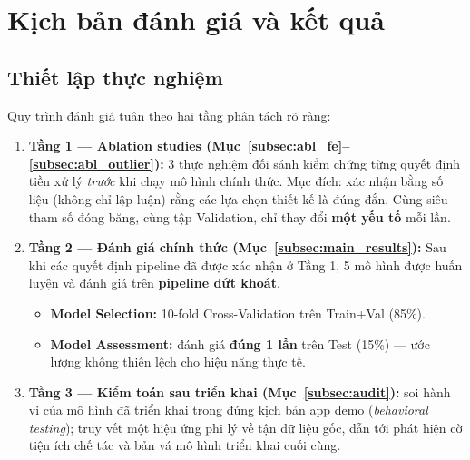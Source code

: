 \section{Kịch bản đánh giá và kết quả}
\label{sec:eval}

\subsection{Thiết lập thực nghiệm}

Quy trình đánh giá tuân theo hai tầng phân tách rõ ràng:

\begin{enumerate}[leftmargin=*, itemsep=3pt]
  \item \textbf{Tầng 1 — Ablation studies (Mục~\ref{subsec:abl_fe}--\ref{subsec:abl_outlier}):}
        3 thực nghiệm đối sánh kiểm chứng từng quyết định tiền xử lý \textit{trước} khi chạy
        mô hình chính thức.
        Mục đích: xác nhận bằng số liệu (không chỉ lập luận) rằng các lựa chọn thiết kế
        là đúng đắn.
        Cùng siêu tham số đóng băng, cùng tập Validation, chỉ thay đổi \textbf{một yếu tố} mỗi lần.

  \item \textbf{Tầng 2 — Đánh giá chính thức (Mục~\ref{subsec:main_results}):}
        Sau khi các quyết định pipeline đã được xác nhận ở Tầng 1,
        5 mô hình được huấn luyện và đánh giá trên \textbf{pipeline dứt khoát}.
        \begin{itemize}[itemsep=1pt]
          \item \textbf{Model Selection:} 10-fold Cross-Validation trên Train+Val (85\%).
          \item \textbf{Model Assessment:} đánh giá \textbf{đúng 1 lần} trên Test (15\%)
                — ước lượng không thiên lệch cho hiệu năng thực tế.
        \end{itemize}

  \item \textbf{Tầng 3 — Kiểm toán sau triển khai (Mục~\ref{subsec:audit}):}
        soi hành vi của mô hình đã triển khai trong đúng kịch bản app demo
        (\textit{behavioral testing}); truy vết một hiệu ứng phi lý về tận dữ liệu gốc,
        dẫn tới phát hiện cờ tiện ích chế tác và bản vá mô hình triển khai cuối cùng.
\end{enumerate}

